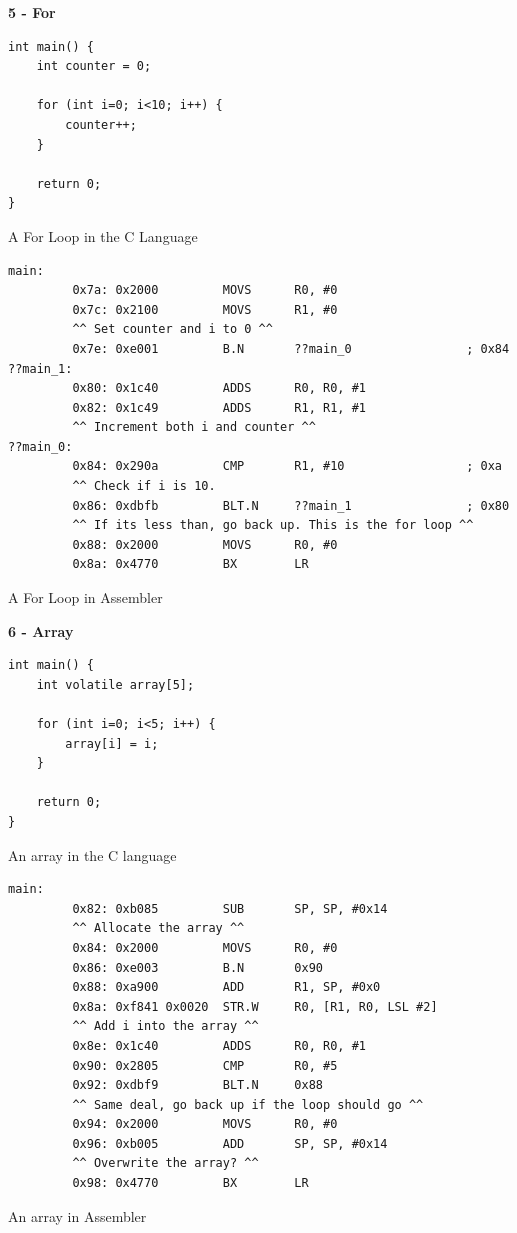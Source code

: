 \documentclass[12pt,a4paper]{report}
\begin{document}
\begin{normalsize}
\textbf{5 - For} \\

\lstset{language=C}
\begin{lstlisting}
int main() {
    int counter = 0;

    for (int i=0; i<10; i++) {
        counter++;
    }

    return 0;
}
\end{lstlisting}	
\begin{center}
\small{A For Loop in the C Language}
\end{center}

\lstset{language=[x86masm]Assembler}
\begin{lstlisting}
main:
         0x7a: 0x2000         MOVS      R0, #0
         0x7c: 0x2100         MOVS      R1, #0
         ^^ Set counter and i to 0 ^^
         0x7e: 0xe001         B.N       ??main_0                ; 0x84
??main_1:
         0x80: 0x1c40         ADDS      R0, R0, #1
         0x82: 0x1c49         ADDS      R1, R1, #1
         ^^ Increment both i and counter ^^
??main_0:
         0x84: 0x290a         CMP       R1, #10                 ; 0xa
         ^^ Check if i is 10.
         0x86: 0xdbfb         BLT.N     ??main_1                ; 0x80
         ^^ If its less than, go back up. This is the for loop ^^         
         0x88: 0x2000         MOVS      R0, #0
         0x8a: 0x4770         BX        LR
\end{lstlisting}	
\begin{center}
\small{A For Loop in Assembler}
\end{center}


\textbf{6 - Array} \\

\lstset{language=C}
\begin{lstlisting}
int main() {
    int volatile array[5];

    for (int i=0; i<5; i++) {
        array[i] = i;
    }

    return 0;
}
\end{lstlisting}	
\begin{center}
\small{An array in the C language}
\end{center}

\lstset{language=[x86masm]Assembler}
\begin{lstlisting}
main:
         0x82: 0xb085         SUB       SP, SP, #0x14
         ^^ Allocate the array ^^
         0x84: 0x2000         MOVS      R0, #0
         0x86: 0xe003         B.N       0x90
         0x88: 0xa900         ADD       R1, SP, #0x0
         0x8a: 0xf841 0x0020  STR.W     R0, [R1, R0, LSL #2]
         ^^ Add i into the array ^^
         0x8e: 0x1c40         ADDS      R0, R0, #1
         0x90: 0x2805         CMP       R0, #5
         0x92: 0xdbf9         BLT.N     0x88
         ^^ Same deal, go back up if the loop should go ^^
         0x94: 0x2000         MOVS      R0, #0
         0x96: 0xb005         ADD       SP, SP, #0x14
         ^^ Overwrite the array? ^^
         0x98: 0x4770         BX        LR
\end{lstlisting}	
\begin{center}
\small{An array in Assembler}
\end{center}



\end{normalsize}
\end{document}
